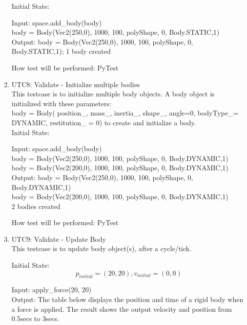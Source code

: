 \documentclass[12pt, titlepage]{article}
\begin{document}
\begin{enumerate}
Initial State: 

Input: space.add\_body(body)\\
body = Body(Vec2(250,0), 1000, 100, polyShape, 0, Body.STATIC,1)\\

Output: body = Body(Vec2(250,0), 1000, 100, polyShape, 0, Body.STATIC,1); 1 body created

How test will be performed: PyTest\\

\item{UTC8}{: Validate - Initialize multiple bodies\\}
This testcase is to initialize multiple body objects.
A body object is initialized with these parameters:\\ 
body = Body( position\_, mass\_, inertia\_, shape\_, angle=0, bodyType\_= DYNAMIC, restitution\_ = 0) to create and initialize a body.\\

Initial State: 

Input: space.add\_body(body)\\
body = Body(Vec2(250,0), 1000, 100, polyShape, 0, Body.DYNAMIC,1)\\
body = Body(Vec2(200,0), 1000, 100, polyShape, 0, Body.DYNAMIC,1)\\

Output: body = Body(Vec2(250,0), 1000, 100, polyShape, 0, Body.DYNAMIC,1)\\
        body = Body(Vec2(200,0), 1000, 100, polyShape, 0, Body.DYNAMIC,1)\\
        2 bodies created

How test will be performed: PyTest\\

\item{UTC9}{: Validate - Update Body\\}
This testcase is to update body object(s), after a cycle/tick.

Initial State: \[p_{initial} = (20,20), v_{initial} = (0, 0)\]
            
Input: apply\_force(20, 20)\\
Output: The table below displays the position and time of a rigid body when a force is applied. The result shows the output velocity and position from 0.5secs to 3secs.
\begin{table} [h!]
	
	\centering
	
	\begin{tabular}{|c|c|c|c}
		

\end{tabular}
\end{table}
\end{enumerate}
\end{document}
